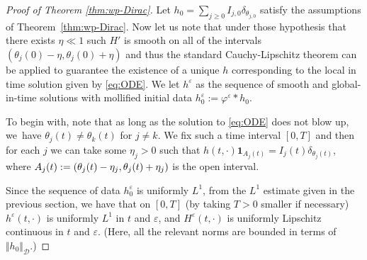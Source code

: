 \documentclass[JEP,XML,SOM,Unicode,NoFloatCountersInSection,published]{cedram}
\theoremstyle{plain}
\theoremstyle{definition}
\newcommand{\nrm}[1]{\Vert#1\Vert}
\let\dlt\delta
\let\tht\theta
\let\varep\varepsilon
\newcommand{\calD}{\mathcal D}
\begin{document}
\begin{proof}[Proof of Theorem \ref{thm:wp-Dirac}]
Let $h_0 = \sum_{j\ge0} I_{j,0}\dlt_{\tht_{j,0}}$ satisfy the assumptions of Theorem~\ref{thm:wp-Dirac}. Now let us note that under those hypothesis that there exists $\eta\ll1 $ such $H'$ is smooth on all of the intervals $\left(\theta_j(0)-\eta,\theta_j(0)+\eta\right)$ and thus the standard Cauchy-Lipschitz theorem can be applied to guarantee the existence of a unique $h$ corresponding to the local in time solution given by \eqref{eq:ODE}. We let $h^\varep$ as the sequence of smooth and global-in-time solutions with mollified initial data $h^\varep_0 := \varphi^\varep * h_0$.

To begin with, note that as long as the solution to \eqref{eq:ODE} does not blow up, we~have $\tht_{j}(t) \ne \tht_{k}(t)$ for $j\ne k$. We fix such a time interval $[0,T]$ and then for each $j$ we can take some $\eta_{j}>0$ such that $h(t,\cdot) \mathbf{1}_{A_{j}(t)} = I_{j}(t) \dlt_{\tht_j(t)}$, where $A_{j}(t):= (\tht_{j}(t) -\nobreak \eta_{j}, \tht_{j}(t)+\nobreak\eta_{j})$ is the open interval.

Since the sequence of data $h_0^{\varep}$ is uniformly $L^1$, from the $L^1$ estimate given in the previous section, we have that on $[0,T]$ (by taking $T>0$ smaller if necessary) $h^\varep(t,\cdot)$ is uniformly $L^1$ in $t$ and $\varep$, and $H^{\varep}(t,\cdot)$ is uniformly Lipschitz continuous in $t$ and $\varep$. (Here, all the relevant norms are bounded in terms of $\nrm{h_0}_{\calD}$.)


\end{proof}
\end{document}
